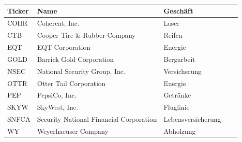 \documentclass[12pt]{article}
\begin{document}
    
    \printbibliography[heading=bibintoc, title={References}]


    \begin{table}[htp]
        \begin{center}
            
            \begin{tabular}{ | l | l | l | l | l | }

                \hline
                \textbf{Ticker}      & \textbf{Name}                             & \textbf{Geschäft} \\
                \hline
                COHR                 & Coherent, Inc.                            & Laser \\
                CTB                  & Cooper Tire \& Rubber Company             & Reifen \\
                EQT                  & EQT Corporation                           & Energie \\
                GOLD                 & Barrick Gold Corporation                  & Bergarbeit \\
                NSEC                 & National Security Group, Inc.             & Versicherung \\
                OTTR                 & Otter Tail Corporation                    & Energie \\
                PEP                  & PepsiCo, Inc.                             & Getränke \\
                SKYW                 & SkyWest, Inc.                             & Fluglinie \\
                SNFCA                & Security National Financial Corporation   & Lebensversicherung \\
                WY                   & Weyerhaeuser Company                      & Abholzung \\
                \hline

            \end{tabular}

        \end{center}
    \end{table}
\end{document}
